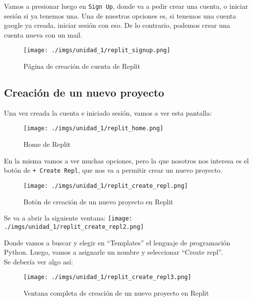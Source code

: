 \documentclass[
  letterpaper,
  DIV=11,
  numbers=noendperiod]{scrreprt}
\begin{document}
Vamos a presionar luego en \texttt{Sign\ Up}, donde va a pedir crear una
cuenta, o iniciar sesión si ya tenemos una. Una de nuestras opciones es,
si tenemos una cuenta google ya creada, iniciar sesión con eso. De lo
contrario, podemos crear una cuenta nueva con un mail.

\begin{figure}[H]

{\centering \texttt{[image: ./imgs/unidad\_1/replit\_signup.png]}

}

\caption{Página de creación de cuenta de Replit}

\end{figure}%

\subsection{Creación de un nuevo
proyecto}\label{creaciuxf3n-de-un-nuevo-proyecto}

Una vez creada la cuenta e iniciado sesión, vamos a ver esta pantalla:

\begin{figure}[H]

{\centering \texttt{[image: ./imgs/unidad\_1/replit\_home.png]}

}

\caption{Home de Replit}

\end{figure}%

En la misma vamos a ver muchas opciones, pero la que nosotros nos
interesa es el botón de \texttt{+\ Create\ Repl}, que nos va a permitir
crear un nuevo proyecto.

\begin{figure}[H]

{\centering \texttt{[image: ./imgs/unidad\_1/replit\_create\_repl.png]}

}

\caption{Botón de creación de un nuevo proyecto en Replit}

\end{figure}%

Se va a abrir la siguiente ventana:
\texttt{[image: ./imgs/unidad\_1/replit\_create\_repl2.png]}

Donde vamos a buscar y elegir en ``Templates'' el lenguaje de
programación Python. Luego, vamos a asignarle un nombre y seleccionar
``Create repl''.\\
Se debería ver algo así:

\begin{figure}[H]

{\centering \texttt{[image: ./imgs/unidad\_1/replit\_create\_repl3.png]}

}

\caption{Ventana completa de creación de un nuevo proyecto en Replit}

\end{figure}%
\end{document}
